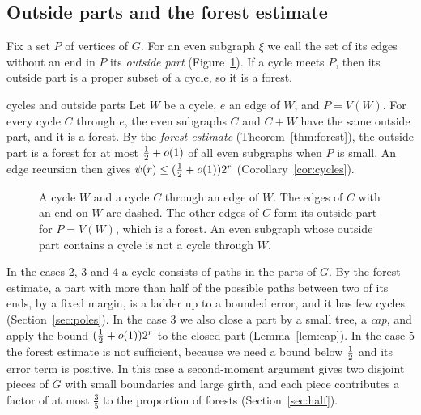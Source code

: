 \subsection{Outside parts and the forest estimate}

Fix a set $P$ of vertices of $G$. For an even subgraph $\xi$ we call the set of its edges without
an end in $P$ its \emph{outside part} (Figure~\ref{fig:outside}). If a cycle meets $P$, then its
outside part is a proper subset of a cycle, so it is a forest.

\begin{idea}{cycles and outside parts}
Let $W$ be a cycle, $e$ an edge of $W$, and $P=V(W)$. For every cycle $C$ through $e$, the even
subgraphs $C$ and $C+W$ have the same outside part, and it is a forest. By
the \emph{forest estimate} (Theorem~\ref{thm:forest}), the outside part is a forest for at most
$\tfrac12+o(1)$ of all even subgraphs when $P$ is small. An edge recursion then gives
$\psi(r)\le(\tfrac12+o(1))2^{r}$ (Corollary~\ref{cor:cycles}).
\end{idea}

\begin{figure}[ht]
\centering
{}
\caption{A cycle $W$ and a cycle $C$ through an edge of $W$. The edges of $C$ with an end on $W$
are dashed. The other edges of $C$ form its outside part for $P=V(W)$, which is a forest. An even
subgraph whose outside part contains a cycle is not a cycle through $W$.}
\label{fig:outside}
\end{figure}

In the cases 2, 3 and 4 a cycle consists of paths in the parts of $G$. By the forest estimate,
a part with more than half of the possible paths between two of its ends, by a fixed margin, is a
ladder up to a bounded error, and it has few cycles (Section~\ref{sec:poles}). In the case 3
we also close a part by a small tree, a \emph{cap}, and apply the bound $(\tfrac12+o(1))2^{r}$ to
the closed part (Lemma~\ref{lem:cap}). In the case 5 the
forest estimate is not sufficient, because we need a bound below $\tfrac12$ and its error term is
positive. In this case a second-moment argument gives two disjoint pieces of $G$ with small
boundaries and large girth, and each piece contributes a factor of at most $\frac35$ to the
proportion of forests (Section~\ref{sec:half}).

